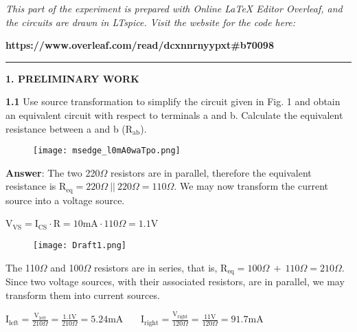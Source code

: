 \documentclass{article}
\begin{document}
\large

{\textit{This part of the experiment is prepared with Online LaTeX Editor Overleaf, and the circuits are drawn in LTspice. Visit the website for the code here:}}

{\textbf{https://www.overleaf.com/read/dcxnnrnyypxt\#b70098}}
\vspace{4mm}
\hrule
\vspace{4mm}
{\Large \textbf{1. PRELIMINARY WORK}}

\vspace{4mm}



{\textbf{1.1} Use source transformation to simplify the circuit given in Fig. 1 and obtain an 
equivalent circuit with respect to terminals a and b. Calculate the equivalent resistance 
between a and b (R$_{\text{ab}}$).}

\begin{figure}[H]
    \centering
    \texttt{[image: msedge\_l0mA0waTpo.png]}
\end{figure}

\vspace{4mm}

{\textbf{Answer}: The two 220$\Omega$ resistors are in parallel, therefore the equivalent resistance is R$_\text{eq} = 220\Omega \ || \ 220\Omega = 110\Omega$. We may now transform the current source into a voltage source.}

\vspace{4mm}

{V$_\text{VS} = \text{I}_\text{CS} \cdot \text{R} = 10\text{mA} \cdot 110\Omega = 1.1\text{V} $}

\vspace{4mm}

\begin{figure}[H]
    \centering
    \texttt{[image: Draft1.png]}
\end{figure}

{The 110$\Omega$ and 100$\Omega$ resistors are in series, that is, R$_\text{eq} = 100\Omega \ + \ 110\Omega = 210\Omega$. Since two voltage sources, with their associated resistors, are in parallel, we may transform them into current sources.}

\vspace{4mm}

{I$\displaystyle _\text{left} = \frac{\text{V}_\text{left}}{\text{210}\Omega} = \frac{1.1\text{V}}{\text{210}\Omega} = 5.24\text{mA}$} \ \ \ {I$\displaystyle _\text{right} = \frac{\text{V}_\text{right}}{\text{120}\Omega} = \frac{11\text{V}}{\text{120}\Omega} = 91.7\text{mA}$}
\end{document}
